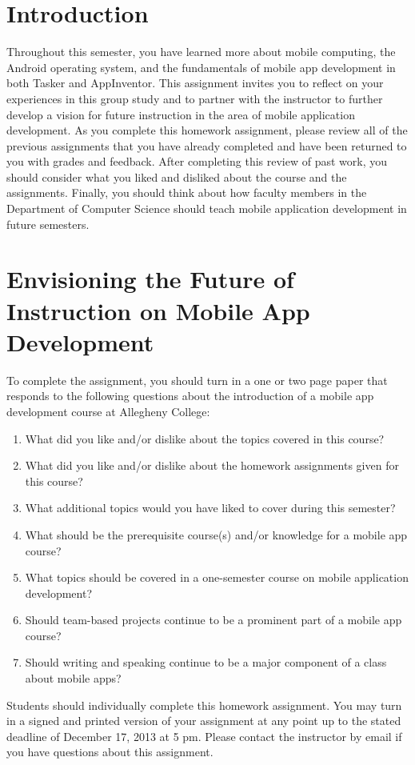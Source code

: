 

\usepackage[compact]{titlesec}



\section*{Introduction}

Throughout this semester, you have learned more about mobile computing, the Android operating system, and the
fundamentals of mobile app development in both Tasker and AppInventor.  This assignment invites you to reflect on your
experiences in this group study and to partner with the instructor to further develop a vision for future instruction in
the area of mobile application development. As you complete this homework assignment, please review all of the previous
assignments that you have already completed and have been returned to you with grades and feedback.  After completing
this review of past work, you should consider what you liked and disliked about the course and the assignments.
Finally, you should think about how faculty members in the Department of Computer Science should teach mobile
application development in future semesters.

\section*{Envisioning the Future of Instruction on Mobile App Development}

\vspace*{-.05in}
\noindent
To complete the assignment, you should turn in a one or two page paper that responds to the following questions about
the introduction of a mobile app development course at Allegheny College: 
\vspace*{-.2in}
\begin{enumerate}
    \itemsep0em
    \item What did you like and/or dislike about the topics covered in this course?
    \item What did you like and/or dislike about the homework assignments given for this course?
    \item What additional topics would you have liked to cover during this semester?
    \item What should be the prerequisite course(s) and/or knowledge for a mobile app course? 
    \item What topics should be covered in a one-semester course on mobile application development?  
    \item Should team-based projects continue to be a prominent part of a mobile app course?
    \item Should writing and speaking continue to be a major component of a class about mobile apps?
\end{enumerate} 

Students should individually complete this homework assignment.  You may turn in a signed and printed version of your
assignment at any point up to the stated deadline of December 17, 2013 at 5 pm. Please contact the instructor by email
if you have questions about this assignment.

